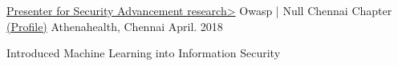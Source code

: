 \begin{cventries}
  \cventry
    {\href{https://null.co.in/profile/11346-teja-kummarikuntla}{Presenter for Security Advancement research>}} %
    {Owasp | Null Chennai Chapter \href{https://null.co.in/profile/11346-teja-kummarikuntla}{(Profile)}} %
    {Athenahealth, Chennai} %
    {April. 2018} %
    {
      \begin{cvitems} %
        \item {Introduced Machine Learning into Information Security}
      \end{cvitems}
    }

\end{cventries}
